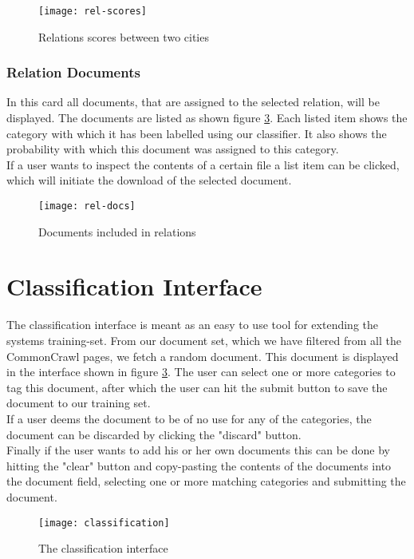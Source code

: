 \begin{figure}[H]
    \centering
    \texttt{[image: rel-scores]}
    \caption{Relations scores between two cities}
    \label{fig:rel-scores}
\end{figure}

\subsubsection{Relation Documents}\label{sec:rel-docs}

In this card all documents, that are assigned to the selected relation, will be displayed. The documents are listed as shown figure \ref{fig:classification}. Each listed item shows the category with which it has been labelled using our classifier. It also shows the probability with which this document was assigned to this category.\\
If a user wants to inspect the contents of a certain file a list item can be clicked, which will initiate the download of the selected document.

\begin{figure}[H]
    \centering
    \texttt{[image: rel-docs]}
    \caption{Documents included in relations}
    \label{fig:rel-docs}
\end{figure}


\section{Classification Interface}

The classification interface is meant as an easy to use tool for extending the systems training-set. From our document set, which we have filtered from all the CommonCrawl pages, we fetch a random document. This document is displayed in the interface shown in figure \ref{fig:classification}. The user can select one or more categories to tag this document, after which the user can hit the submit button to save the document to our training set.\\
If a user deems the document to be of no use for any of the categories, the document can be discarded by clicking the "discard" button.\\
Finally if the user wants to add his or her own documents this can be done by hitting the "clear" button and copy-pasting the contents of the documents into the document field, selecting one or more matching categories and submitting the document.

\begin{figure}[H]
    \centering
    \texttt{[image: classification]}
    \caption{The classification interface}
    \label{fig:classification}
\end{figure}

